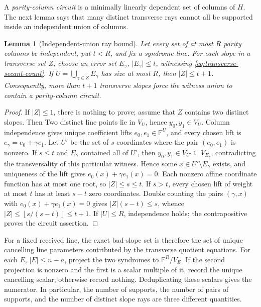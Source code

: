 \documentclass[12pt,a4paper]{amsart}
\numberwithin{equation}{section}
\newtheorem{lemma}[lemma]{Lemma}
\theoremstyle{remark}
\newcommand{\F}{\mathbb F}
\newcommand{\abs}[1]{\lvert #1\rvert}
\newcommand{\floor}[1]{\left\lfloor #1\right\rfloor}
\begin{document}
A \emph{parity-column circuit} is a minimally linearly dependent set of
columns of \(H\).  The next lemma says that many distinct transverse rays
cannot all be supported inside an independent union of columns.

\begin{lemma}[Independent-union ray bound]
\label{lem:independent-union-rays}
Let every set of at most \(R\) parity columns be independent, put
\(t<R\), and fix a syndrome line.  For each slope in a transverse set
\(Z\), choose an error set \(E_\gamma\), \(\abs{E_\gamma}\le t\),
witnessing \eqref{eq:transverse-secant-count}.  If
\(U=\bigcup_{\gamma\in Z}E_\gamma\) has size at most \(R\), then
\(\abs Z\le t+1\).  Consequently, more than \(t+1\) transverse slopes
force the witness union to contain a parity-column circuit.
\end{lemma}

\begin{proof}
If \(\abs Z\le1\), there is nothing to prove; assume that \(Z\) contains
two distinct slopes.  Then
Two distinct line points lie in \(V_U\), hence \(y_0,y_1\in V_U\).
Column independence gives unique coefficient lifts
\(e_0,e_1\in\F^U\), and every chosen lift is
\(e_\gamma=e_0+\gamma e_1\).  Let \(U'\) be the set of \(s\) coordinates
where the pair \((e_0,e_1)\) is nonzero.  If \(s\le t\) and
\(E_\gamma\) contained all of \(U'\), then
\(y_0,y_1\in V_{U'}\subseteq V_{E_\gamma}\), contradicting the
transversality of this particular witness.  Hence some
\(x\in U'\setminus E_\gamma\) exists, and uniqueness of the lift gives
\(e_0(x)+\gamma e_1(x)=0\).  Each nonzero affine coordinate function has
at most one root, so \(\abs Z\le s\le t\).  If \(s>t\), every chosen lift of
weight at most \(t\) has at least \(s-t\) zero coordinates.  Double
counting the pairs \((\gamma,x)\) with
\(e_0(x)+\gamma e_1(x)=0\) gives
\(\abs Z(s-t)\le s\), whence
\(\abs Z\le\floor{s/(s-t)}\le t+1\).  If \(\abs U\le R\), independence
holds; the contrapositive proves the circuit assertion.
\end{proof}

For a fixed received line, the exact bad-slope set is therefore the set of
unique cancelling line parameters contributed by the transverse quotient
equations.  For each \(E\), \(\abs E\le n-a\), project the two
syndromes to \(\F^R/V_E\).  If the second projection is nonzero and the
first is a scalar multiple of it, record the unique cancelling scalar;
otherwise record nothing.  Deduplicating these scalars gives the numerator.
In particular, the number of supports, the number of pairs of supports, and
the number of distinct slope rays are three different quantities.
\end{document}
